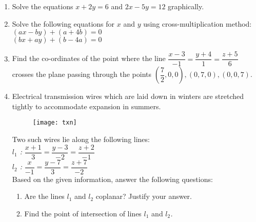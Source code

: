%
\begin{enumerate}
	\item Solve the equations $x+2y=6$ and $2x-5y=12$ graphically.
	\vspace{4mm}
\item Solve the following equations for $x$ and $y$ using cross-multiplication method:\\
	\indent\indent\indent$(ax-by)+(a+4b)=0$\\\indent\indent$(bx+ay)+(b-4a)=0$
		\vspace{4mm}
\item Find the co-ordinates of the point where the line $\dfrac{x-3}{-1}=\dfrac{y+4}{1}=\dfrac{z+5}{6}$ crosses the plane passing through the points $\left(\dfrac{7}{2},0,0\right),(0,7,0),(0,0,7)$.
	\vspace{4mm}
\item Electrical transmission wires which are laid down in winters are stretched tightly to accommodate expansion in summers.\\
	\begin{figure}[H]
		\centering
		\texttt{[image: txn]}\\
	\end{figure}
	Two such wires lie along the following lines:
\vspace{2.4mm}\\
	{\itshape\rmfamily $l_1$ : }$\dfrac{x+1}{3}=\dfrac{y-3}{-2}=\dfrac{z+2}{-1}$\vspace{1.35mm}\\
	{\itshape\rmfamily $l_2$ : }$\dfrac{x}{-1}=\dfrac{y-7}{3}=\dfrac{z+7}{-2}$\vspace{4.7mm}\\
	Based on the given information, answer the following questions:
			\begin{enumerate}
				\item	Are the lines {\itshape\rmfamily $l_1$} and {\itshape\rmfamily $l_2$} coplanar? Justify your answer.
				\item    Find the point of intersection of lines {\itshape\rmfamily $l_1$} and {\itshape\rmfamily $l_2$.}

\end{enumerate}
\end{enumerate}
